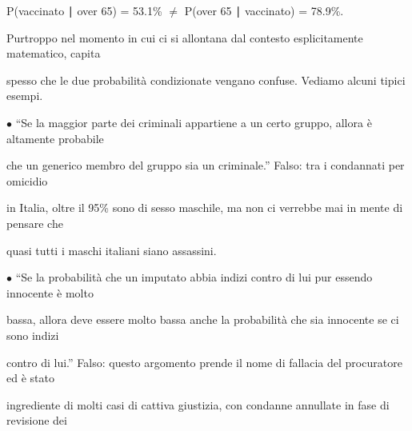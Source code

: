 \documentclass[a4paper,portrait,12pt]{article}
\begin{document}
\begin{flushleft}
P(vaccinato ∣ over 65) = 53.1\% $\neq$ P(over 65 ∣ vaccinato) = 78.9\%.
\end{flushleft}


\begin{flushleft}
Purtroppo nel momento in cui ci si allontana dal contesto esplicitamente matematico, capita
\end{flushleft}


\begin{flushleft}
spesso che le due probabilit\`{a} condizionate vengano confuse. Vediamo alcuni tipici esempi.
\end{flushleft}


\begin{flushleft}
$\bullet$ {``}Se la maggior parte dei criminali appartiene a un certo gruppo, allora \`{e} altamente probabile
\end{flushleft}


\begin{flushleft}
che un generico membro del gruppo sia un criminale.'' Falso: tra i condannati per omicidio
\end{flushleft}


\begin{flushleft}
in Italia, oltre il 95\% sono di sesso maschile, ma non ci verrebbe mai in mente di pensare che
\end{flushleft}


\begin{flushleft}
quasi tutti i maschi italiani siano assassini.
\end{flushleft}


\begin{flushleft}
$\bullet$ {``}Se la probabilit\`{a} che un imputato abbia indizi contro di lui pur essendo innocente \`{e} molto
\end{flushleft}


\begin{flushleft}
bassa, allora deve essere molto bassa anche la probabilit\`{a} che sia innocente se ci sono indizi
\end{flushleft}


\begin{flushleft}
contro di lui.'' Falso: questo argomento prende il nome di fallacia del procuratore ed \`{e} stato
\end{flushleft}


\begin{flushleft}
ingrediente di molti casi di cattiva giustizia, con condanne annullate in fase di revisione dei
\end{flushleft}
\end{document}
